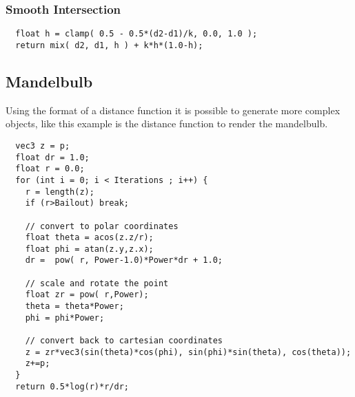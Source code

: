 \documentclass[../pbr.text]{subfile}
\begin{document}
\subsubsection{Smooth Intersection}%
\label{ssub:smooth_intersection}
\begin{verbatim}
  float h = clamp( 0.5 - 0.5*(d2-d1)/k, 0.0, 1.0 );
  return mix( d2, d1, h ) + k*h*(1.0-h);
\end{verbatim}

\subsection{Mandelbulb}%
\label{sub:mandelbulb}

Using the format of a distance function it is possible to generate more complex
objects, like this example is the distance function to render the mandelbulb.
\begin{verbatim}
  vec3 z = p;
  float dr = 1.0;
  float r = 0.0;
  for (int i = 0; i < Iterations ; i++) {
    r = length(z);
    if (r>Bailout) break;

    // convert to polar coordinates
    float theta = acos(z.z/r);
    float phi = atan(z.y,z.x);
    dr =  pow( r, Power-1.0)*Power*dr + 1.0;

    // scale and rotate the point
    float zr = pow( r,Power);
    theta = theta*Power;
    phi = phi*Power;

    // convert back to cartesian coordinates
    z = zr*vec3(sin(theta)*cos(phi), sin(phi)*sin(theta), cos(theta));
    z+=p;
  }
  return 0.5*log(r)*r/dr;
\end{verbatim}
\end{document}
